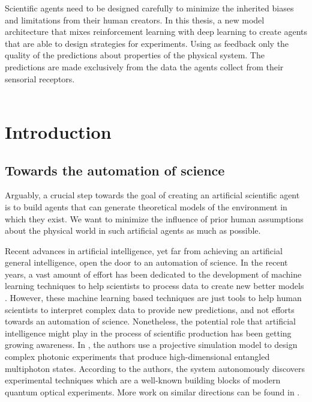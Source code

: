 \documentclass[11pt,a4paper,twoside]{report}
\newcommand{\+}{\textnormal{+} }
\theoremstyle{definition}
\numberwithin{equation}{chapter}
\begin{document}
Scientific agents need to be designed carefully to minimize the
inherited biases and limitations from their human creators. In this thesis, a
new model architecture that mixes reinforcement learning with deep learning to
create agents that are able to design strategies for experiments. Using as
feedback only the quality of the predictions about properties of the physical
system. The predictions are made exclusively from the data the agents collect
from their sensorial receptors. \\
\\

\vspace{12mm}


\chapter{Introduction} \label{Introduction}
\section{Towards the automation of science}

Arguably, a crucial step towards the goal of creating an artificial scientific
agent is to build agents that can generate theoretical models of the environment
in which they exist. We want to minimize the influence of prior human
assumptions about the physical world in such artificial agents as much as
possible.


Recent advances in artificial intelligence, yet far from achieving an artificial
general intelligence, open the door to an automation of science. In the recent
years, a vast amount of effort has been dedicated to the development of machine
learning techniques to help scientists to process data to create new better
models \cite{Carleo_2019}. However, these machine learning based techniques are
just tools to help human scientists to interpret complex data to provide new
predictions, and not efforts towards an automation of science. Nonetheless, the
potential role that artificial intelligence might play in the process of
scientific production has been getting growing awareness. In
\cite{Melnikov_2018}, the authors use a projective simulation model to design
complex photonic experiments that produce high-dimensional entangled multiphoton
states. According to the authors, the system autonomously discovers experimental
techniques which are a well-known building blocks of modern quantum optical
experiments. More work on similar directions can be found in
\cite{ried2019minimal,Wu_2019,De_Simone_2019,
PhysRevD.99.015014,rahaman2019learning,nautrup2020operationally}.
\end{document}
